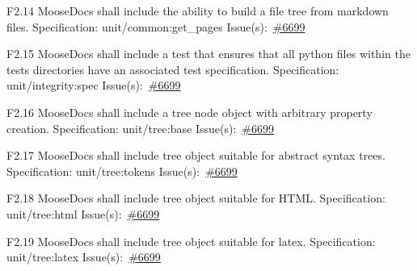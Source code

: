 \begin{Requirement}{F2.14}
MooseDocs shall include the ability to build a file tree from markdown files.
\newline
Specification: unit/common:get\_pages
\newline
Issue(s):~\href{https://github.com/idaholab/moose/issues/6699}{\#6699}
\end{Requirement}

\begin{Requirement}{F2.15}
MooseDocs shall include a test that ensures that all python files within the tests directories have an associated test specification.
\newline
Specification: unit/integrity:spec
\newline
Issue(s):~\href{https://github.com/idaholab/moose/issues/6699}{\#6699}
\end{Requirement}

\begin{Requirement}{F2.16}
MooseDocs shall include a tree node object with arbitrary property creation.
\newline
Specification: unit/tree:base
\newline
Issue(s):~\href{https://github.com/idaholab/moose/issues/6699}{\#6699}
\end{Requirement}

\begin{Requirement}{F2.17}
MooseDocs shall include tree object suitable for abstract syntax trees.
\newline
Specification: unit/tree:tokens
\newline
Issue(s):~\href{https://github.com/idaholab/moose/issues/6699}{\#6699}
\end{Requirement}

\begin{Requirement}{F2.18}
MooseDocs shall include tree object suitable for HTML.
\newline
Specification: unit/tree:html
\newline
Issue(s):~\href{https://github.com/idaholab/moose/issues/6699}{\#6699}
\end{Requirement}

\begin{Requirement}{F2.19}
MooseDocs shall include tree object suitable for latex.
\newline
Specification: unit/tree:latex
\newline
Issue(s):~\href{https://github.com/idaholab/moose/issues/6699}{\#6699}
\end{Requirement}

